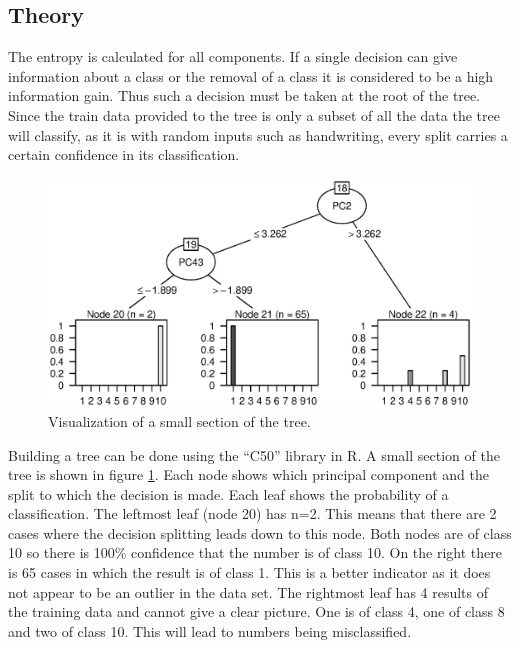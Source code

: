 \subsection{Theory}

The entropy is calculated for all components.
If a single decision can give information about a class or the removal of a class it is considered to be a high information gain.
Thus such a decision must be taken at the root of the tree.
Since the train data provided to the tree is only a subset of all the data the tree will classify, as it is with random inputs such as handwriting, every split carries a certain confidence in its classification.

\begin{figure}[h]
\includegraphics[width = \textwidth]{graphics/tree_section}
\caption[Visualization of a tree.]{Visualization of a small section of the tree.}
\label{fig:tree_section}
\end{figure}

Building a tree can be done using the ``C50'' library in R.
A small section of the tree is shown in figure \ref{fig:tree_section}.
Each node shows which principal component and the split to which the decision is made.
Each leaf shows the probability of a classification.
The leftmost leaf (node 20) has n=2. This means that there are 2 cases where the decision splitting leads down to this node.
Both nodes are of class 10 so there is 100\% confidence that the number is of class 10.
On the right there is 65 cases in which the result is of class 1. 
This is a better indicator as it does not appear to be an outlier in the data set.
The rightmost leaf has 4 results of the training data and cannot give a clear picture.
One is of class 4, one of class 8 and two of class 10. 
This will lead to numbers being misclassified.

